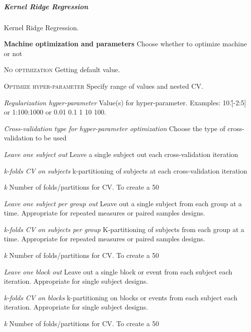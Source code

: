 \subparagraph{Kernel Ridge Regression}
Kernel Ridge Regression.


\textbf{Machine optimization and parameters}
Choose whether to optimize machine or not


\textsc{No optimization}
Getting default value.


\textsc{Optimize hyper-parameter}
Specify range of values and nested CV.


\textsl{Regularization hyper-parameter}
Value(s) for hyper-parameter. Examples: 10.\^[-2:5] or 1:100:1000 or 0.01 0.1 1 10 100.


\textsl{Cross-validation type for hyper-parameter optimization}
Choose the type of cross-validation to be used


\textit{Leave one subject out}
Leave a single subject out each cross-validation iteration


\textit{k-folds CV on subjects}
k-partitioning of subjects at each cross-validation iteration


\textit{k}
Number of folds/partitions for CV. To create a 50%


\textit{Leave one subject per group out}
Leave out a single subject from each group at a time. Appropriate for repeated measures or paired samples designs.


\textit{k-folds CV on subjects per group}
K-partitioning of subjects from each group at a time. Appropriate for repeated measures or paired samples designs.


\textit{k}
Number of folds/partitions for CV. To create a 50%


\textit{Leave one block out}
Leave out a single block or event from each subject each iteration. Appropriate for single subject designs.


\textit{k-folds CV on blocks}
k-partitioning on blocks or events from each subject each iteration. Appropriate for single subject designs.


\textit{k}
Number of folds/partitions for CV. To create a 50%


